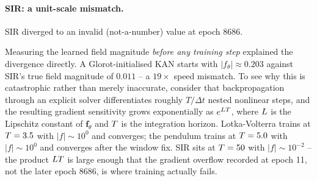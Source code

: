 \paragraph{SIR: a unit-scale mismatch.} SIR diverged to an invalid
(not-a-number) value at epoch 8686.

\begin{expectbox}
\end{expectbox}

Measuring the learned field magnitude
\emph{before any training step} explained the divergence directly. A
Glorot-initialised KAN starts with $|f_\theta|\approx0.203$ against SIR's
true field magnitude of $0.011$ -- a $19\times$ speed mismatch. To see why
this is catastrophic rather than merely inaccurate, consider that
backpropagation through an explicit solver differentiates roughly $T/\Delta t$
nested nonlinear steps, and the resulting gradient sensitivity grows
exponentially as $e^{L T}$, where $L$ is the Lipschitz
constant of $\mathbf{f}_\theta$ and $T$ is the integration horizon.
Lotka-Volterra trains at $T=3.5$ with $|f|\sim10^0$ and converges;
the pendulum trains at $T=5.0$ with $|f|\sim10^0$ and converges after
the window fix. SIR sits at $T=50$ with $|f|\sim10^{-2}$ -- the
product $LT$ is large enough that the gradient overflow recorded
at epoch 11, not the later epoch 8686, is where training actually fails.

